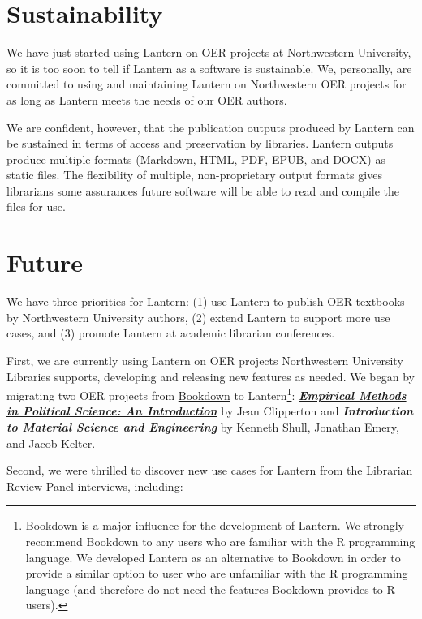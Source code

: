 \documentclass{book}
\begin{document}
\hypertarget{sustainability}{%
\section{Sustainability}\label{sustainability}}

We have just started using Lantern on OER projects at Northwestern University,
so it is too soon to tell if Lantern as a software is sustainable. We,
personally, are committed to using and maintaining Lantern on Northwestern OER
projects for as long as Lantern meets the needs of our OER authors.

We are confident, however, that the publication outputs produced by Lantern
can be sustained in terms of access and preservation by libraries. Lantern
outputs produce multiple formats (Markdown, HTML, PDF, EPUB, and DOCX) as
static files. The flexibility of multiple, non-proprietary output formats
gives librarians some assurances future software will be able to read and
compile the files for use.

\hypertarget{future}{%
\section{Future}\label{future}}

We have three priorities for Lantern: (1) use Lantern to publish OER textbooks
by Northwestern University authors, (2) extend Lantern to support more use
cases, and (3) promote Lantern at academic librarian conferences.

First, we are currently using Lantern on OER projects Northwestern University
Libraries supports, developing and releasing new features as needed. We began
by migrating two OER projects from \href{https://bookdown.org/}{Bookdown} to
Lantern\footnote{Bookdown is a major influence for the development of Lantern.
  We strongly recommend Bookdown to any users who are familiar with the R
  programming language. We developed Lantern as an alternative to Bookdown in
  order to provide a similar option to user who are unfamiliar with the R
  programming language (and therefore do not need the features Bookdown
  provides to R users).}:
\href{https://emps.northwestern.pub/}{\textbf{\emph{Empirical Methods in
Political Science: An Introduction}}} by Jean Clipperton and
\textbf{\emph{Introduction to Material Science and Engineering}} by Kenneth
Shull, Jonathan Emery, and Jacob Kelter.

Second, we were thrilled to discover new use cases for Lantern from the
Librarian Review Panel interviews, including:
\end{document}

